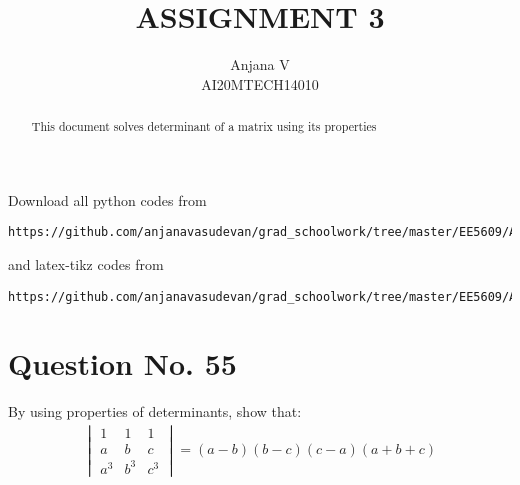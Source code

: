 \documentclass[journal,12pt,twocolumn]{IEEEtran}
\title{ASSIGNMENT 3}
\author{Anjana V\\AI20MTECH14010 }
\begin{document}
\makeatletter
\renewcommand*\env@matrix[1][*\c@MaxMatrixCols c]{%
  \hskip -\arraycolsep
  \let\@ifnextchar\new@ifnextchar
  \array{#1}}
\makeatother
\newcommand{\myvec}[1]{\ensuremath{\begin{pmatrix}#1\end{pmatrix}}}
\newcommand{\mydet}[1]{\ensuremath{\begin{vmatrix}#1\end{vmatrix}}}
\renewcommand{\vec}[1]{\mathbf{#1}}
\maketitle
\begin{abstract}
This document solves determinant of a matrix using its properties
\end{abstract}
Download all python codes from 
%
\begin{lstlisting}
https://github.com/anjanavasudevan/grad_schoolwork/tree/master/EE5609/Assignment2
\end{lstlisting}
%
and latex-tikz codes from 
%
\begin{lstlisting}
https://github.com/anjanavasudevan/grad_schoolwork/tree/master/EE5609/Assignment2/latex
\end{lstlisting}
%
\section{Question No. 55}
By using properties of determinants, show that:
\begin{align}
\mydet{1 & 1 & 1\\a & b & c\\a^3 & b^3 & c^3} = (a-b)(b-c)(c-a)(a+b+c)
\end{align}
\end{document}
